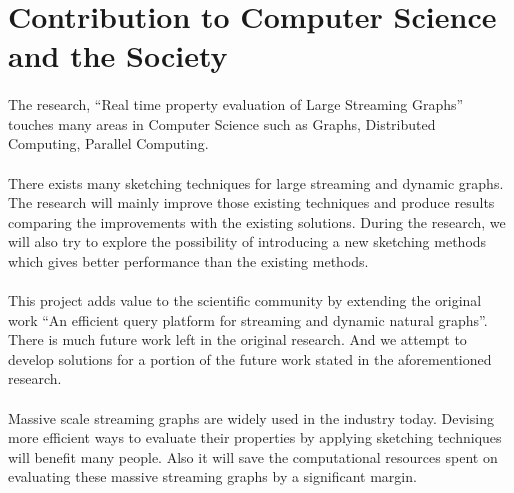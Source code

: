 \section{Contribution to Computer Science and the Society}

\paragraph{}
The research, “Real time property evaluation of Large Streaming Graphs” 
touches many areas in Computer Science such as Graphs, Distributed Computing, 
Parallel Computing. 

\paragraph{}
There exists many sketching techniques for large streaming and dynamic graphs. 
The research will mainly improve those existing techniques and produce 
results comparing the improvements with the existing solutions. During 
the research, we will also try to explore the possibility of introducing 
a new sketching methods which gives better performance than the existing methods. 

\paragraph{}
This project adds value to the scientific community by extending the original work 
“An efficient query platform for streaming and dynamic natural graphs”\cite{kumarage_efficient_2017}. 
There is much future work left in the original research. And we attempt to 
develop solutions for a portion of the future work stated in the aforementioned 
research. 

\paragraph{}
Massive scale streaming graphs are widely used in the industry today. 
Devising more efficient ways to evaluate their properties by applying 
sketching techniques will benefit many people. Also it will save the 
computational resources spent on evaluating these massive streaming graphs 
by a significant margin. 
